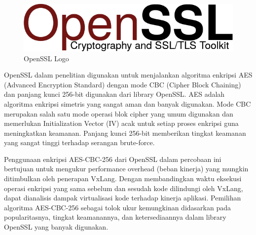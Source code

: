 \begin{figure}
	\centering
	\includegraphics[width=0.25\textheight]
	{assets/pics/OpenSSL_logo.png}
	\caption{OpenSSL Logo \cite{OpenSSL}}
\end{figure}

OpenSSL dalam penelitian digunakan untuk menjalankan algoritma enkripsi AES (Advanced Encryption Standard) dengan mode CBC (Cipher Block Chaining) dan panjang kunci 256-bit digunakan dari library OpenSSL. AES adalah algoritma enkripsi simetris yang sangat aman dan banyak digunakan. Mode CBC merupakan salah satu mode operasi blok cipher yang umum digunakan dan memerlukan Initialization Vector (IV) acak untuk setiap proses enkripsi guna meningkatkan keamanan. Panjang kunci 256-bit memberikan tingkat keamanan yang sangat tinggi terhadap serangan brute-force.

Penggunaan enkripsi AES-CBC-256 dari OpenSSL dalam percobaan ini bertujuan untuk mengukur performance overhead (beban kinerja) yang mungkin ditimbulkan oleh penerapan VxLang. Dengan membandingkan waktu eksekusi operasi enkripsi yang sama sebelum dan sesudah kode dilindungi oleh VxLang, dapat dianalisis dampak virtualisasi kode terhadap kinerja aplikasi. Pemilihan algoritma AES-CBC-256 sebagai tolok ukur kemungkinan didasarkan pada popularitasnya, tingkat keamanannya, dan ketersediaannya dalam library OpenSSL yang banyak digunakan.
